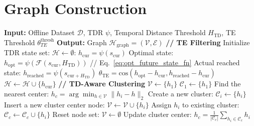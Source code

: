\documentclass{article}
\begin{document}




\appendix
\onecolumn
\section{Graph Construction}
\label{app:graph_construction}

\begin{algorithm}[h!t!]
    \caption{TD-Aware Graph Construction}
    \begin{algorithmic}
        \STATE \textbf{Input:} Offline Dataset $\mathcal{D}$, TDR $\psi$, Temporal Distance Threshold $H_{\text{TD}}$, TE Threshold $\theta_{TE}^{\text{thresh}}$
        \STATE \textbf{Output:} Graph $\mathcal{H}_{\text{graph}} = (\mathcal{V}, \mathcal{E})$
        \vspace{15pt}  
        \STATE \textbf{// TE Filtering}
        \STATE Initialize TDR state set: $\mathcal{H} \gets \emptyset$: 
                \STATE $h_{\text{cur}} = \psi(s_{\text{cur}})$
                \STATE Optimal state: $h_{\text{opt}} = \psi(\mathcal{F}(s_{\text{cur}}, H_{\text{TD}}))$ // Eq.~\eqref{eq:opt_future_state_fn} 
                \STATE Actual reached state: $h_{\text{reached}} = \psi(s_{\text{cur} + H_{\text{TD}}})$
                \STATE $\theta_\text{TE} = \text{cos}(h_{\text{opt}}-h_{\text{cur}}, h_{\text{reached}}-h_{\text{cur}})$
                    \STATE $\mathcal{H} \gets \mathcal{H} \cup \{h_{\text{cur}}\}$
                \ENDIF
            \ENDFOR
        \ENDFOR
        \vspace{15pt} 
        \STATE \textbf{// TD-Aware Clustering}
        \STATE $\mathcal{V} \gets \{h_1\}$
        \STATE $\mathcal{C}_1 \gets \{h_1\}$
            \STATE Find the nearest center: $h_c = \arg\min_{h \in \mathcal{V}} \|h_i - h\|_2$
                \STATE Create a new cluster: $\mathcal{C}_i \gets \{h_i\}$
                \STATE Insert a new cluster center node: $\mathcal{V} \gets \mathcal{V} \cup \{h_i\}$
            \ELSE
                \STATE Assign $h_i$ to existing cluster: $\mathcal{C}_c \gets \mathcal{C}_c \cup \{h_i\}$
            \ENDIF
        \ENDFOR
        \STATE Reset node set: $\mathcal{V} \gets \emptyset$
            \STATE Update cluster center: $h_c = \frac{1}{|\mathcal{C}_c|} \sum_{h_i \in \mathcal{C}_c} h_i$

\end{algorithmic}
\end{algorithm}
\end{document}
